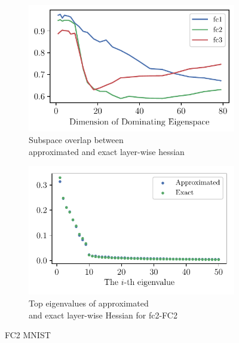 \begin{figure}[th]
    \centering
    \begin{subfigure}[b]{0.5\textwidth}
        \centering
        \captionsetup{justification=centering}
        \includegraphics[width=\textwidth]{Figures/ApproxQuality/FC2_fixlr/sample_kron_decomp_traceoverlap_d80_MNIST_Exp1_FC2_fixlr0.01R2_E-1.pdf}
        \caption{Subspace overlap between\\ approximated and exact layer-wise hessian}
        \label{fig:overlap_approx}
    \end{subfigure}%
    \begin{subfigure}[b]{0.5\textwidth}
        \centering
        \captionsetup{justification=centering}
        \includegraphics[width=\textwidth]{Figures/ApproxQuality/FC2_fixlr/eigenval_compare_top50_MNIST_Exp1_FC2_fixlr0.01R2_E-1_fc2.pdf}
        \caption{Top eigenvalues of approximated\\ and exact layer-wise Hessian for fc2-FC2}
        \label{fig:eigenval_approx}
    \end{subfigure}
    \caption{FC2 MNIST }
    \label{fig:approx_result}
\end{figure}

